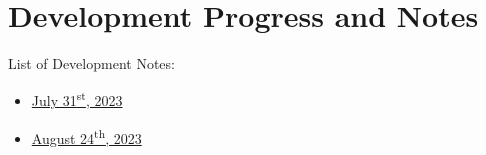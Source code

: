 \documentclass[a4paper,12pt,oneside,pdflatex,italian,final,twocolumn]{article}
\begin{document}
	\section{Development Progress and Notes}

	List of Development Notes:
	\begin{itemize}
		\item \href{https://github.com/deninur2427/ecu_pnm/blob/main/docs/notes/tes_31072023.md}{July 31\textsuperscript{st}, 2023}

		\item \href{https://github.com/deninur2427/ecu_pnm/blob/main/docs/notes/tes_24082023.md}{August 24\textsuperscript{th}, 2023}
	\end{itemize}
\end{document}
